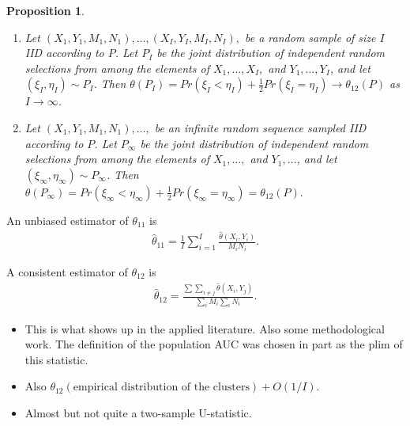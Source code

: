 \documentclass{beamer}
\newcommand{\I}{I}
\renewcommand{\P}{P}
\newcommand{\cind}{\perp \!\!\! \perp}
\newcommand{\aucindiv}{\theta_{11}}%
\newcommand{\aucpop}{\theta_{12}}%
\newcommand{\aucindivhat}{\hat{\theta}_{11}}%
\newcommand{\aucpophat}{\hat{\theta}_{12}}%
\newtheorem{proposition}[theorem]{Proposition}
\newcommand{\speak}[1]{
  \iftoggle{speaktoggle}{
    {\tiny{\textcolor{red}{speak: #1}}\normalsize}
  }
  {}
}
\begin{document}
\begin{frame}
\begin{proposition}
  \label{proposition:aucpop}
  \begin{enumerate}
  \item Let $(X_1,Y_1,M_1,N_1),\ldots,(X_\I,Y_\I,M_\I,N_\I),$
    be a random sample of size $\I$ IID according to $\P$. Let $\P_\I$ be
    the joint distribution of independent random selections from
    among the elements of $X_1,\ldots,X_\I,$ and $Y_1,\ldots,Y_\I$, and
    let $(\xi_\I,\eta_\I)\sim\P_\I$. Then
    $\theta(\P_\I)=Pr(\xi_\I<\eta_\I)+\frac{1}{2}Pr(\xi_I=\eta_I) \to \theta_{12}(\P)$
    as $\I\to\infty$.
  \item Let $(X_1,Y_1,M_1,N_1),\ldots,$
    be an infinite random sequence sampled IID according to $\P$. Let $\P_\infty$ be
    the joint distribution of independent random selections from
    among the elements of $X_1,\ldots,$ and $Y_1,\ldots$, and
    let $(\xi_\infty,\eta_\infty)\sim\P_\infty$. Then
    $\theta(\P_\infty)=Pr(\xi_\infty<\eta_\infty)+\frac{1}{2}Pr(\xi_\infty=\eta_\infty)=\theta_{12}(\P).$    
  \end{enumerate}
\end{proposition}
\end{frame}



\begin{frame}
An unbiased estimator of $\aucindiv$ is
\begin{align}
  \aucindivhat = \frac{1}{I}\sum_{i=1}^\I \frac{\hat\theta(X_i,Y_i)}{M_iN_i}. \label{defn:aucindivhat}
\end{align}
\end{frame}

\begin{frame}
  A consistent estimator of $\aucpop$ is
\begin{align}
  \aucpophat = \frac{\sum\sum_{i\neq j}\hat\theta(X_i,Y_j)}{\sum_iM_i\sum_iN_i}. \label{defn:aucpophat}
\end{align}
\begin{itemize}
\item This is what shows up in the applied literature. Also some
methodological work.\speak{Previous analysis [obu] uses ratio estimator. Ends up with an asy variance estimator nearly same as jk and [cite other work].} The definition of the population AUC was chosen in part as the
plim of this statistic.


\item Also $\theta_{12}(\text{empirical distribution of the clusters})+O(1/\I)$.

\item  Almost but not quite a two-sample U-statistic.
\end{itemize}


\end{frame}
\end{document}
